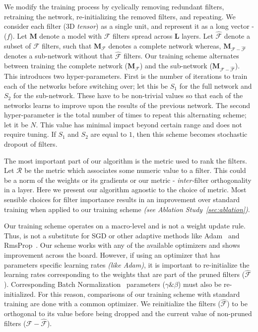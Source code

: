 We modify the training process by cyclically removing redundant filters, retraining the network, re-initializing the removed filters, and repeating. 
We consider each filter ($3$D\textit{ tensor}) as a single unit, and represent it as a long vector - ($f$).
Let $\mathbf{M}$ denote a model with $\mathcal{F}$ filters spread across $\mathbf{L}$ layers. 
Let $\mathcal{\widehat{F}}$ denote a subset of $\mathcal{F}$ filters, such that $\mathbf{M}_\mathcal{F}$ denotes a complete network whereas, $\mathbf{M}_\mathcal{F-\widehat{F}}$ denotes a sub-network without that $\mathcal{\widehat{F}}$ filters.
Our training scheme alternates between training the complete network ($\mathbf{M}_\mathcal{F}$) and the sub-network ($\mathbf{M}_\mathcal{F-\widehat{F}}$).
This introduces two hyper-parameters.
First is the number of iterations to train each of the networks before switching over; let this be $S_1$ for the full network and $S_2$ for the sub-network. 
These have to be non-trivial values so that each of the networks learns to improve upon the results of the previous network.
The second hyper-parameter is the total number of times to repeat this alternating scheme; let it be $N$. 
This value has minimal impact beyond certain range and does not require tuning.
If $S_1$ and $S_2$ are equal to $1$, then this scheme becomes stochastic dropout of filters. 


The most important part of our algorithm is the metric used to rank the filters. 
Let $\mathcal{R}$ be the metric which associates some numeric value to a filter. 
This could be a norm of the weights or its gradients or our metric - \textit{inter-}filter orthogonality in a layer.
Here we present our algorithm agnostic to the choice of metric. Most sensible choices for filter importance results in an improvement over standard training when applied to our training scheme \textit{(see Ablation Study~\ref{sec:ablation})}.


Our training scheme operates on a macro-level and is not a weight update rule.
Thus, is not a substitute for SGD or other adaptive methods like Adam~\cite{Kingma2014AdamAM} and RmsProp~\cite{Tieleman2012}. 
Our scheme works with any of the available optimizers and shows improvement across the board. %
However, if using an optimizer that has parameters specific learning rates \textit{(like Adam)}, it is important to re-initialize the learning rates corresponding to the weights
that are part of the pruned filters ($\mathcal{\widehat{F}}$).
Corresponding Batch Normalization~\cite{Ioffe2015BatchNA} parameters ($\gamma \& \beta$) must also be re-initialized.
For this reason, comparisons of our training scheme with standard training are done with a common optimizer.
We reinitialize the filters ($\mathcal{\widehat{F}}$) to be orthogonal to its value before being dropped and the current value of non-pruned filters ($\mathcal{F-\widehat{F}}$).

